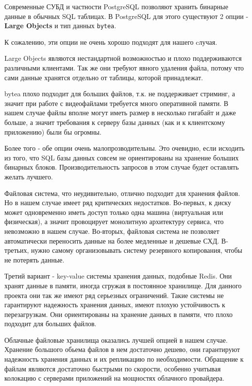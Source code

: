 Современные СУБД и частности PostgreSQL позволяют хранить бинарные данные в обычных SQL таблицах. В PostgreSQL для этого существуют 2 опции - \textbf{Large Objects} и тип данных \texttt{bytea}.

К сожалению, эти опции не очень хорошо подходят для нашего cлучая.

Large Objects являются нестандартной возможностью и плохо поддерживаются различными клиентами. Так же они требуют явного удаления файла, потому что сами данные хранятся отдельно от таблицы, которой принадлежат.

bytea плохо подходит для больших файлов, т.к. не поддерживает стриминг, а значит при работе с видеофайлами требуется много оперативной памяти. В нашем случае файлы вполне могут иметь размер в несколько гигабайт и даже больше, а значит требования к серверу базы данных (как и к клиентскому приложению) были бы огромны.

Более того - обе опции очень малопрозводительны. Это очевидно, если исходить из того, что SQL базы данных совсем не ориентированы на хранение больших бинарных блоков. Производительность запросов в этом случае будет оставлять желать лучшего.

Файловая система, что неудивительно, отлично подходит для хранения файлов. Но в нашем случае имеет ряд критических недостатков. Во-первых, к диску может одновременно иметь доступ только одна машина (виртуальная или физическая), а значит провоцирует монолитную архитектуру сервиса, что невозможно в нашем случае. Во-вторых, файловая система не позволяет автоматически переносить данные на более медленные и дешевые СХД. В-третьих, нужно самому организовывать систему резервного копирования, чтобы не потерять данные.

Третий вариант - key-value системы хранения данных, подобные Redis. Они хранят данные в памяти, иногда сгружая в постоянное хранилище. Для данного проекта они так же имеют ряд серьезных ограничений. Такие системы не гарантируют надежность хранения данных, имеют плохую устойчивость к перезагрузкам. Они ориентированы на хранение данных в памяти, что плохо подходит для больших файлов.

Облачные файловые хранилища оказались лучшей опцией в нашем случае. Хранение большого обьема файлов в нем достаточно дешево, они гарантируют надежность хранения данных и их репликацию по необходимости. Обращение к файлам являются достаточно быстрыми по скорости, особенно учитывая колокацию с серверами приложений на мощностях облачного провайдера.

